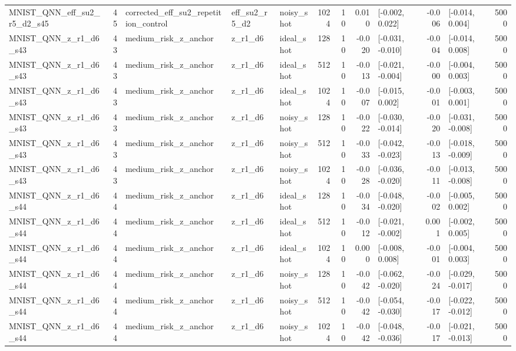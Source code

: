 \begin{table}[t]
\begin{tabular}{lrlllrrrlrlr}
MNIST\_QNN\_eff\_su2\_r5\_d2\_s45 & 45 & corrected\_eff\_su2\_repetition\_control & eff\_su2\_r5\_d2 & noisy\_shot & 1024 & 10 & 0.010 & [-0.002, 0.022] & -0.006 & [-0.014, 0.004] & 5000 \\
MNIST\_QNN\_z\_r1\_d6\_s43 & 43 & medium\_risk\_z\_anchor & z\_r1\_d6 & ideal\_shot & 128 & 10 & -0.020 & [-0.031, -0.010] & -0.004 & [-0.014, 0.008] & 5000 \\
MNIST\_QNN\_z\_r1\_d6\_s43 & 43 & medium\_risk\_z\_anchor & z\_r1\_d6 & ideal\_shot & 512 & 10 & -0.013 & [-0.021, -0.004] & -0.000 & [-0.004, 0.003] & 5000 \\
MNIST\_QNN\_z\_r1\_d6\_s43 & 43 & medium\_risk\_z\_anchor & z\_r1\_d6 & ideal\_shot & 1024 & 10 & -0.007 & [-0.015, 0.002] & -0.001 & [-0.003, 0.001] & 5000 \\
MNIST\_QNN\_z\_r1\_d6\_s43 & 43 & medium\_risk\_z\_anchor & z\_r1\_d6 & noisy\_shot & 128 & 10 & -0.022 & [-0.030, -0.014] & -0.020 & [-0.031, -0.008] & 5000 \\
MNIST\_QNN\_z\_r1\_d6\_s43 & 43 & medium\_risk\_z\_anchor & z\_r1\_d6 & noisy\_shot & 512 & 10 & -0.033 & [-0.042, -0.023] & -0.013 & [-0.018, -0.009] & 5000 \\
MNIST\_QNN\_z\_r1\_d6\_s43 & 43 & medium\_risk\_z\_anchor & z\_r1\_d6 & noisy\_shot & 1024 & 10 & -0.028 & [-0.036, -0.020] & -0.011 & [-0.013, -0.008] & 5000 \\
MNIST\_QNN\_z\_r1\_d6\_s44 & 44 & medium\_risk\_z\_anchor & z\_r1\_d6 & ideal\_shot & 128 & 10 & -0.034 & [-0.048, -0.020] & -0.002 & [-0.005, 0.002] & 5000 \\
MNIST\_QNN\_z\_r1\_d6\_s44 & 44 & medium\_risk\_z\_anchor & z\_r1\_d6 & ideal\_shot & 512 & 10 & -0.012 & [-0.021, -0.002] & 0.001 & [-0.002, 0.005] & 5000 \\
MNIST\_QNN\_z\_r1\_d6\_s44 & 44 & medium\_risk\_z\_anchor & z\_r1\_d6 & ideal\_shot & 1024 & 10 & 0.000 & [-0.008, 0.008] & -0.001 & [-0.004, 0.003] & 5000 \\
MNIST\_QNN\_z\_r1\_d6\_s44 & 44 & medium\_risk\_z\_anchor & z\_r1\_d6 & noisy\_shot & 128 & 10 & -0.042 & [-0.062, -0.020] & -0.024 & [-0.029, -0.017] & 5000 \\
MNIST\_QNN\_z\_r1\_d6\_s44 & 44 & medium\_risk\_z\_anchor & z\_r1\_d6 & noisy\_shot & 512 & 10 & -0.042 & [-0.054, -0.030] & -0.017 & [-0.022, -0.012] & 5000 \\
MNIST\_QNN\_z\_r1\_d6\_s44 & 44 & medium\_risk\_z\_anchor & z\_r1\_d6 & noisy\_shot & 1024 & 10 & -0.042 & [-0.048, -0.036] & -0.017 & [-0.021, -0.013] & 5000 \\

\end{tabular}
\end{table}
